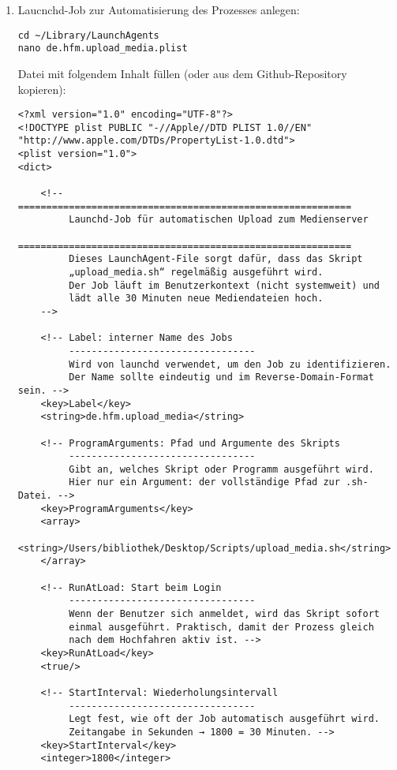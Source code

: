 \documentclass[12pt,a4paper]{report}
\begin{document}
\begin{enumerate}
    \item Laucnchd-Job zur Automatisierung des Prozesses anlegen:
    \begin{verbatim}
cd ~/Library/LaunchAgents
nano de.hfm.upload_media.plist
    \end{verbatim}

    Datei mit folgendem Inhalt füllen (oder aus dem Github-Repository kopieren):

    \begin{verbatim}
<?xml version="1.0" encoding="UTF-8"?>
<!DOCTYPE plist PUBLIC "-//Apple//DTD PLIST 1.0//EN" "http://www.apple.com/DTDs/PropertyList-1.0.dtd">
<plist version="1.0">
<dict>

    <!-- ===========================================================
         Launchd-Job für automatischen Upload zum Medienserver
         ===========================================================
         Dieses LaunchAgent-File sorgt dafür, dass das Skript
         „upload_media.sh“ regelmäßig ausgeführt wird.
         Der Job läuft im Benutzerkontext (nicht systemweit) und
         lädt alle 30 Minuten neue Mediendateien hoch.
    -->

    <!-- Label: interner Name des Jobs
         ---------------------------------
         Wird von launchd verwendet, um den Job zu identifizieren.
         Der Name sollte eindeutig und im Reverse-Domain-Format sein. -->
    <key>Label</key>
    <string>de.hfm.upload_media</string>

    <!-- ProgramArguments: Pfad und Argumente des Skripts
         ---------------------------------
         Gibt an, welches Skript oder Programm ausgeführt wird.
         Hier nur ein Argument: der vollständige Pfad zur .sh-Datei. -->
    <key>ProgramArguments</key>
    <array>
        <string>/Users/bibliothek/Desktop/Scripts/upload_media.sh</string>
    </array>

    <!-- RunAtLoad: Start beim Login
         ---------------------------------
         Wenn der Benutzer sich anmeldet, wird das Skript sofort
         einmal ausgeführt. Praktisch, damit der Prozess gleich
         nach dem Hochfahren aktiv ist. -->
    <key>RunAtLoad</key>
    <true/>

    <!-- StartInterval: Wiederholungsintervall
         ---------------------------------
         Legt fest, wie oft der Job automatisch ausgeführt wird.
         Zeitangabe in Sekunden → 1800 = 30 Minuten. -->
    <key>StartInterval</key>
    <integer>1800</integer>


\end{verbatim}
\end{enumerate}
\end{document}
